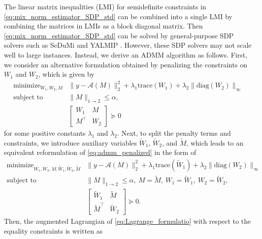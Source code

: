 \documentclass[11pt]{article}
\begin{document}
The linear matrix inequalities (LMI) for semidefinite constraints in \eqref{eq:mix_norm_estimator_SDP_std} can be combined into a single LMI by combining the matrices in LMIs as a block diagonal matrix. 
Then \eqref{eq:mix_norm_estimator_SDP_std} can be solved by general-purpose SDP solvers such as SeDuMi \citep{sturm1999sedumi} and YALMIP \citep{lofberg2004yalmip}.
However, these SDP solvers may not scale well to large instances. 
Instead, we derive an ADMM algorithm \citep{boyd2011distributed} as follows. 
First, we consider an alternative formulation obtained by penalizing the constraints on $W_1$ and $W_2$, which is given by
\begin{equation}
\label{eq:admm_penalized}
\begin{array}{ll}
\displaystyle \mathop{\text{minimize}}_{W_1,W_2,M} & \|y - \mathcal{A}(M)\|_2^2 + \lambda_1 \mathrm{trace}(W_1) + \lambda_2 \|\mathrm{diag}(W_2)\|_\infty  \\
\text{subject to} & \|M\|_{1 \rightarrow 2} \leq \alpha, \\[5pt]
&\begin{bmatrix}
W_1 & M \\
M^\top & W_2
\end{bmatrix} \succeq 0
\end{array}
\end{equation}
for some positive constants $\lambda_1$ and $\lambda_2$. 
Next, to split the penalty terms and constraints, we introduce auxiliary variables $\widetilde{W}_1$, $\widetilde{W}_2$, and $\widetilde{M}$, which leads to an equivalent reformulation of \eqref{eq:admm_penalized} in the form of 
\begin{equation}
\label{eq:Lagrange_formulatio}
\begin{array}{ll}
\displaystyle \mathop{\text{minimize}}_{W_1,W_2,M,\tilde{W}_1,\widetilde{W}_2,\widetilde{M}} & \|y - \mathcal{A}(M)\|_2^2 + \lambda_1 \mathrm{trace}(\widetilde{W}_1) + \lambda_2 \|\mathrm{diag}(W_2)\|_\infty  \\
\text{subject to} & \|M\|_{1 \rightarrow 2} \leq \alpha, \ M=\widetilde{M}, \ W_1 = \widetilde{W}_1, \ W_2 = \widetilde{W}_2, \\[5pt]
&\begin{bmatrix}
\widetilde{W}_1 & \widetilde{M} \\
\widetilde{M}^\top & \widetilde{W}_2
\end{bmatrix} \succeq 0.
\end{array}
\end{equation}
Then, the augmented Lagrangian of \eqref{eq:Lagrange_formulatio} with respect to the equality constraints is written as
\end{document}
